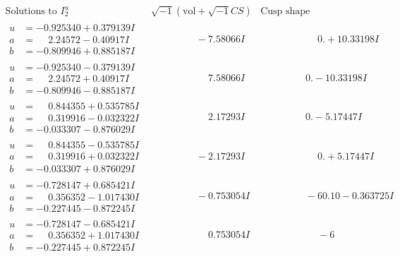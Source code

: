\documentclass[1p]{elsarticle_modified}
\theoremstyle{definition}
\newcommand{\I}{\sqrt{-1}}
\begin{document}
$$\begin{array}{c|c|c}  
\text{Solutions to }I^u_{2}& \I (\text{vol} + \sqrt{-1}CS) & \text{Cusp shape}\\
 \hline 
\begin{aligned}
u &= -0.925340 + 0.379139 I \\
a &= \phantom{-}2.24572 - 0.40917 I \\
b &= -0.809946 + 0.885187 I\end{aligned}
 & \phantom{-0.000000 } -7.58066 I & \phantom{-0.000000 -}0. + 10.33198 I \\ \hline\begin{aligned}
u &= -0.925340 - 0.379139 I \\
a &= \phantom{-}2.24572 + 0.40917 I \\
b &= -0.809946 - 0.885187 I\end{aligned}
 & \phantom{-0.000000 -}7.58066 I & \phantom{-0.000000 } 0. - 10.33198 I \\ \hline\begin{aligned}
u &= \phantom{-}0.844355 + 0.535785 I \\
a &= \phantom{-}0.319916 - 0.032322 I \\
b &= -0.033307 - 0.876029 I\end{aligned}
 & \phantom{-0.000000 -}2.17293 I & \phantom{-0.000000 } 0. - 5.17447 I \\ \hline\begin{aligned}
u &= \phantom{-}0.844355 - 0.535785 I \\
a &= \phantom{-}0.319916 + 0.032322 I \\
b &= -0.033307 + 0.876029 I\end{aligned}
 & \phantom{-0.000000 } -2.17293 I & \phantom{-0.000000 -}0. + 5.17447 I \\ \hline\begin{aligned}
u &= -0.728147 + 0.685421 I \\
a &= \phantom{-}0.356352 - 1.017430 I \\
b &= -0.227445 - 0.872245 I\end{aligned}
 & \phantom{-0.000000 } -0.753054 I & \phantom{-0.000000 }      -6
0. 10   - 0.363725 I \\ \hline\begin{aligned}
u &= -0.728147 - 0.685421 I \\
a &= \phantom{-}0.356352 + 1.017430 I \\
b &= -0.227445 + 0.872245 I\end{aligned}
 & \phantom{-0.000000 -}0.753054 I & \phantom{-0.000000 -}     -6

\end{array}$$
\end{document}
